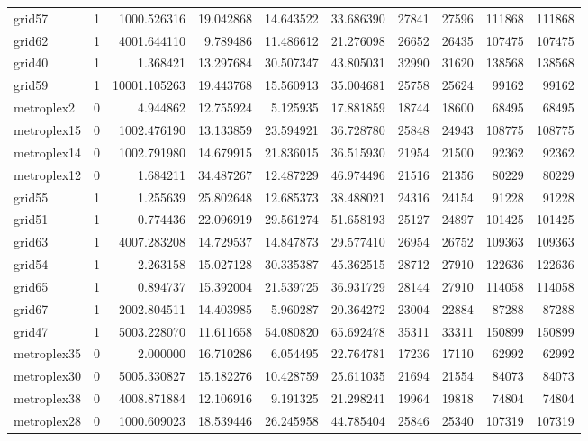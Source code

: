\begin{longtable}{|l|r|r|r|r|r|r|r|r|r|}
grid57 & 1 & 1000.526316 & 19.042868 & 14.643522 & 33.686390 & 27841 & 27596 & 111868 & 111868 \\
grid62 & 1 & 4001.644110 & 9.789486 & 11.486612 & 21.276098 & 26652 & 26435 & 107475 & 107475 \\
grid40 & 1 & 1.368421 & 13.297684 & 30.507347 & 43.805031 & 32990 & 31620 & 138568 & 138568 \\
grid59 & 1 & 10001.105263 & 19.443768 & 15.560913 & 35.004681 & 25758 & 25624 & 99162 & 99162 \\
metroplex2 & 0 & 4.944862 & 12.755924 & 5.125935 & 17.881859 & 18744 & 18600 & 68495 & 68495 \\
metroplex15 & 0 & 1002.476190 & 13.133859 & 23.594921 & 36.728780 & 25848 & 24943 & 108775 & 108775 \\
metroplex14 & 0 & 1002.791980 & 14.679915 & 21.836015 & 36.515930 & 21954 & 21500 & 92362 & 92362 \\
metroplex12 & 0 & 1.684211 & 34.487267 & 12.487229 & 46.974496 & 21516 & 21356 & 80229 & 80229 \\
grid55 & 1 & 1.255639 & 25.802648 & 12.685373 & 38.488021 & 24316 & 24154 & 91228 & 91228 \\
grid51 & 1 & 0.774436 & 22.096919 & 29.561274 & 51.658193 & 25127 & 24897 & 101425 & 101425 \\
grid63 & 1 & 4007.283208 & 14.729537 & 14.847873 & 29.577410 & 26954 & 26752 & 109363 & 109363 \\
grid54 & 1 & 2.263158 & 15.027128 & 30.335387 & 45.362515 & 28712 & 27910 & 122636 & 122636 \\
grid65 & 1 & 0.894737 & 15.392004 & 21.539725 & 36.931729 & 28144 & 27910 & 114058 & 114058 \\
grid67 & 1 & 2002.804511 & 14.403985 & 5.960287 & 20.364272 & 23004 & 22884 & 87288 & 87288 \\
grid47 & 1 & 5003.228070 & 11.611658 & 54.080820 & 65.692478 & 35311 & 33311 & 150899 & 150899 \\
metroplex35 & 0 & 2.000000 & 16.710286 & 6.054495 & 22.764781 & 17236 & 17110 & 62992 & 62992 \\
metroplex30 & 0 & 5005.330827 & 15.182276 & 10.428759 & 25.611035 & 21694 & 21554 & 84073 & 84073 \\
metroplex38 & 0 & 4008.871884 & 12.106916 & 9.191325 & 21.298241 & 19964 & 19818 & 74804 & 74804 \\
metroplex28 & 0 & 1000.609023 & 18.539446 & 26.245958 & 44.785404 & 25846 & 25340 & 107319 & 107319 \\

\end{longtable}
